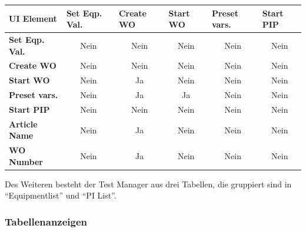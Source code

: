 \begin{table}[h]
  \begin{tabular}{|l|c|c|c|c|c|}
    \hline
    UI Element    & \multicolumn{1}{l|}{Set Eqp. Val.} & \multicolumn{1}{l|}{Create WO} & \multicolumn{1}{l|}{Start WO} & \multicolumn{1}{l|}{Preset vars.} & \multicolumn{1}{l|}{Start PIP} \\ \hline
    \textbf{Set Eqp. Val.} & Nein                                 & Nein                             & Nein                            & Nein                                & Nein                             \\ \hline
    \textbf{Create WO}     & Nein                                 & Nein                             & Nein                            & Nein                                & Nein                             \\ \hline
    \textbf{Start WO}      & Nein                                 & Ja                            & Nein                            & Nein                                & Nein                             \\ \hline
    \textbf{Preset vars.}  & Nein                                 & Ja                            & Ja                           & Nein                                & Nein                             \\ \hline
    \textbf{Start PIP}     & Nein                                 & Nein                             & Nein                            & Nein                                & Nein                             \\ \hline
    \textbf{Article Name}  & Nein                                 & Ja                            & Nein                            & Nein                                & Nein                             \\ \hline
    \textbf{WO Number}     & Nein                                 & Ja                            & Nein                            & Nein                                & Nein                             \\ \hline
  \end{tabular}
\end{table}

\noindent Des Weiteren besteht der Test Manager aus drei Tabellen, die gruppiert sind in \enquote{Equipmentlist} und \enquote{PI List}.

\subsubsection{Tabellenanzeigen}
